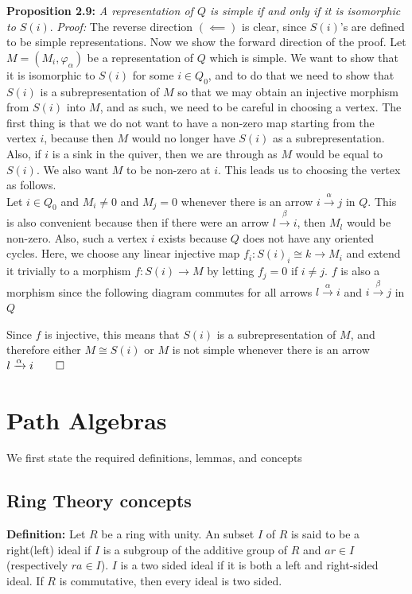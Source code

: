 \documentclass[12pt]{article}
\begin{document}
\begin{enumerate}
\textbf{Proposition 2.9: }\textit{A representation of $Q$ is simple if and only if it is isomorphic to $S(i).$}
\textit{Proof: } The reverse direction $(\impliedby)$ is clear, since
$S(i)$'s are defined to be simple representations. Now we show the forward direction of the proof. Let $M=(M_i, \varphi_\alpha)$ be a representation of $Q$ which is simple. We want to show that it is isomorphic to $S(i)$ for some $i\in Q_0$, and to do that we need to show that $S(i)$ is a subrepresentation of $M$ so that we may obtain an injective morphism from $S(i)$ into $M$, and as such, we need to be careful in choosing a vertex. The first thing is that we do not want to have a non-zero map starting from the vertex $i$, because then $M$ would no longer have $S(i)$ as a subrepresentation. Also, if $i$ is a sink in the quiver, then we are through as $M$ would be equal to $S(i)$. We also want $M$ to be non-zero at $i$. This leads us to choosing the vertex as follows.\\
Let $i\in Q_0$ and $M_i \neq 0$ and $M_j=0$ whenever there is an arrow $i \xrightarrow{\alpha}j$ in $Q$. This is also convenient because then if there were an arrow $l \xrightarrow{\beta}i$, then $M_l$ would be non-zero. Also, such a vertex $i$ exists because $Q$ does not have any oriented cycles. Here, we choose any linear injective map $f_i:S(i)_i \cong k \to M_i$ and extend it trivially to a morphism $f:S(i) \to M$ by letting $f_j=0$ if $i\neq j$. $f$ is also a morphism since the following diagram commutes for all arrows $l\xrightarrow{\alpha}i$ and $i \xrightarrow{\beta}j$ in $Q$
\begin{center}
\end{center}
Since $f$ is injective, this means that $S(i)$ is a subrepresentation of $M$, and therefore either $M\cong S(i)$ or $M$ is not simple whenever there is an arrow $l\xrightarrow{\alpha}i \qed$
 
 \end{enumerate}
 \section[4]{Path Algebras}
We first state the required definitions, lemmas, and concepts
 \subsection*{Ring Theory concepts}
 \textbf{Definition: } Let $R$ be a ring with unity. An subset $I$ of $R$ is said to be a right(left) ideal if $I$ is a subgroup of the additive group of $R$ and $ar\in I$(respectively $ra \in I$). $I$ is a two sided ideal if it is both a left and right-sided ideal. If $R$ is commutative, then every ideal is two sided. \\
\end{document}
